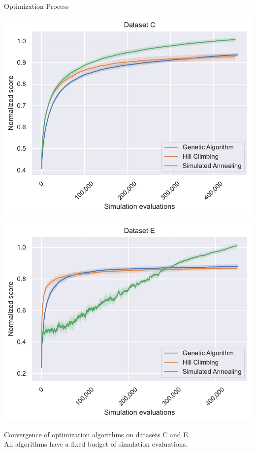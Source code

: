 \documentclass[portrait,a0paper,fontscale=0.28]{baposter}
\begin{document}
\begin{poster}
\begin{posterbox}[column=1, name=result1, below=something2]{Optimization Process}
\begin{minipage}{0.5\linewidth}
    \centering
    \includegraphics[width=1.\linewidth]{img/c_Genetic_Algorithm_Hill_Climbing_Simulated_Annealing.pdf}
\end{minipage}\hfill
\begin{minipage}{0.5\linewidth}
    \centering
    \includegraphics[width=1.\linewidth]{img/e_Genetic_Algorithm_Hill_Climbing_Simulated_Annealing.pdf}
\end{minipage}
\begin{center}
{\small Convergence of optimization algorithms on datasets C and E. \\
All algorithms have a fixed budget of simulation evaluations.}
\end{center}
\end{posterbox}


\end{poster}
\end{document}
